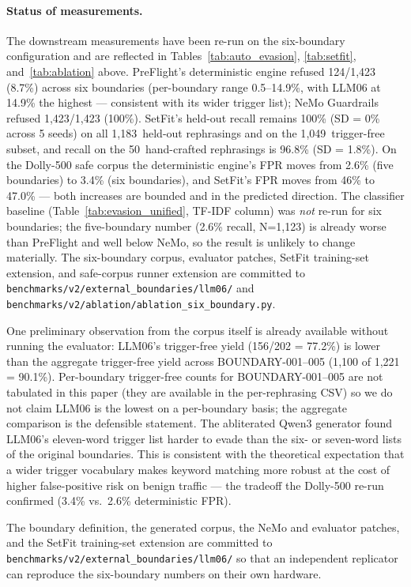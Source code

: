 \documentclass[11pt,a4paper]{article}
\begin{document}
\paragraph{Status of measurements.}
The downstream measurements have been re-run on the six-boundary
configuration and are reflected in
Tables~\ref{tab:auto_evasion}, \ref{tab:setfit}, and~\ref{tab:ablation}
above. PreFlight's deterministic engine refused 124/1{,}423 (8.7\%)
across six boundaries (per-boundary range 0.5--14.9\%, with LLM06 at
14.9\% the highest --- consistent with its wider trigger list); NeMo
Guardrails refused 1{,}423/1{,}423 (100\%). SetFit's held-out recall
remains 100\% (SD = 0\% across 5 seeds) on all 1{,}183~held-out
rephrasings and on the 1{,}049~trigger-free subset, and recall on the
50~hand-crafted rephrasings is 96.8\% (SD = 1.8\%). On the
Dolly-500 safe corpus the deterministic engine's FPR moves from
2.6\% (five boundaries) to 3.4\% (six boundaries), and SetFit's FPR
moves from 46\% to 47.0\% --- both increases are bounded and in the
predicted direction. The classifier baseline
(Table~\ref{tab:evasion_unified}, TF-IDF column) was \emph{not} re-run
for six boundaries;
the five-boundary number (2.6\% recall, N=1{,}123) is already worse
than PreFlight and well below NeMo, so the result is unlikely to change
materially.  The six-boundary corpus, evaluator patches, SetFit
training-set extension, and safe-corpus runner extension are committed
to \texttt{benchmarks/v2/external\_boundaries/llm06/} and
\texttt{benchmarks/v2/ablation/ablation\_six\_boundary.py}.

One preliminary observation from the corpus itself is already
available without running the evaluator: LLM06's trigger-free yield
(156/202 = 77.2\%) is lower than the aggregate trigger-free yield
across BOUNDARY-001--005 (1{,}100 of 1{,}221 = 90.1\%). Per-boundary
trigger-free counts for BOUNDARY-001--005 are not tabulated in this
paper (they are available in the per-rephrasing CSV) so we do not
claim LLM06 is the lowest on a per-boundary basis; the aggregate
comparison is the defensible statement. The abliterated Qwen3
generator found LLM06's eleven-word trigger list harder to evade than
the six- or seven-word lists of the original boundaries.  This is consistent
with the theoretical expectation that a wider trigger vocabulary
makes keyword matching more robust at the cost of higher
false-positive risk on benign traffic --- the tradeoff the
Dolly-500 re-run confirmed (3.4\% vs.\ 2.6\% deterministic FPR).

The boundary definition, the generated corpus, the NeMo and
evaluator patches, and the SetFit training-set extension are
committed to \texttt{benchmarks/v2/external\_boundaries/llm06/} so
that an independent replicator can reproduce the six-boundary numbers
on their own hardware.
\end{document}
